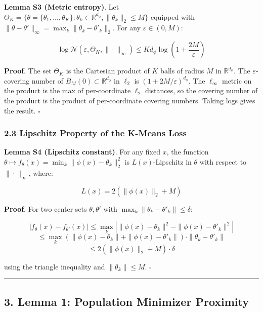 \documentclass[
  12pt,
]{article}
\begin{document}
\textbf{Lemma S3 (Metric entropy)}. Let
\(\Theta_K = \{\theta = \{\theta_1,\dots,\theta_K\} : \theta_k \in \mathbb{R}^{d_\phi}, \|\theta_k\|_2 \leq M\}\)
equipped with
\(\|\theta - \theta'\|_\infty = \max_k \|\theta_k - \theta'_k\|_2\). For
any \(\varepsilon \in (0, M)\):

\[\log \mathcal{N}(\varepsilon, \Theta_K, \|\cdot\|_\infty) \leq K d_\phi \log\left(1 + \frac{2M}{\varepsilon}\right)\]

\textbf{Proof}. The set \(\Theta_K\) is the Cartesian product of \(K\)
balls of radius \(M\) in \(\mathbb{R}^{d_\phi}\). The
\(\varepsilon\)-covering number of
\(B_M(0) \subset \mathbb{R}^{d_\phi}\) in \(\ell_2\) is
\((1+2M/\varepsilon)^{d_\phi}\). The \(\ell_\infty\) metric on the
product is the max of per-coordinate \(\ell_2\) distances, so the
covering number of the product is the product of per-coordinate covering
numbers. Taking logs gives the result. \(\square\)

\subsubsection{2.3 Lipschitz Property of the K-Means
Loss}\label{lipschitz-property-of-the-k-means-loss}

\textbf{Lemma S4 (Lipschitz constant)}. For any fixed \(x\), the
function
\(\theta \mapsto f_\theta(x) = \min_k \|\phi(x) - \theta_k\|_2^2\) is
\(L(x)\)-Lipschitz in \(\theta\) with respect to \(\|\cdot\|_\infty\),
where:

\[L(x) = 2(\|\phi(x)\|_2 + M)\]

\textbf{Proof}. For two center sets \(\theta, \theta'\) with
\(\max_k \|\theta_k - \theta'_k\| \leq \delta\):

\[|f_\theta(x) - f_{\theta'}(x)| \leq \max_k \left| \|\phi(x) - \theta_k\|^2 - \|\phi(x) - \theta'_k\|^2 \right|\]
\[\leq \max_k \left( \|\phi(x) - \theta_k\| + \|\phi(x) - \theta'_k\| \right) \cdot \|\theta_k - \theta'_k\|\]
\[\leq 2\left(\|\phi(x)\|_2 + M\right) \cdot \delta\]

using the triangle inequality and \(\|\theta_k\| \leq M\). \(\square\)

\begin{center}\rule{0.5\linewidth}{0.5pt}\end{center}

\subsection{3. Lemma 1: Population Minimizer
Proximity}\label{lemma-1-population-minimizer-proximity}
\end{document}
